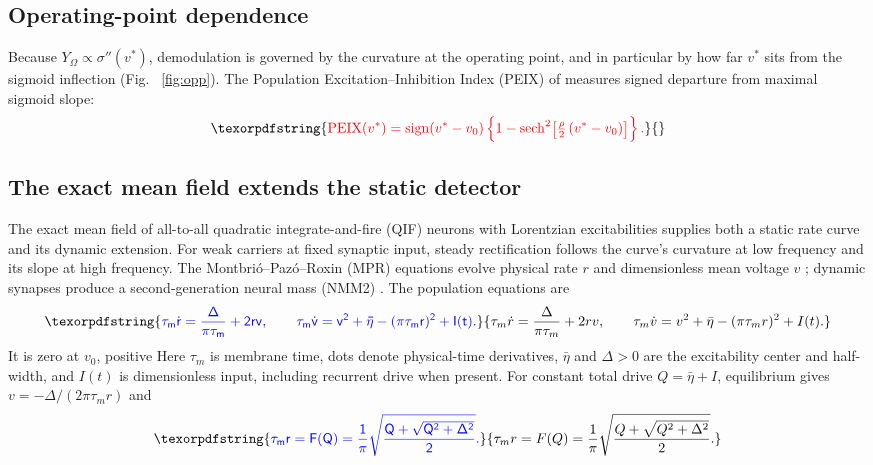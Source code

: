 \documentclass[11pt,a4paper]{article}
\newcommand{\Sig}{\sigma}
\providecommand{\DIFaddtex}[1]{{\protect\color{blue} \sf #1}} %
\providecommand{\DIFdeltex}[1]{{\protect\color{red} \scriptsize #1}} %
\providecommand{\DIFaddbegin}{} %
\providecommand{\DIFaddend}{} %
\providecommand{\DIFdelbegin}{} %
\providecommand{\DIFdelend}{} %
\providecommand{\DIFadd}[1]{\texorpdfstring{\DIFaddtex{#1}}{#1}} %
\providecommand{\DIFdel}[1]{\texorpdfstring{\DIFdeltex{#1}}{}} %
\begin{document}
\DIFdelbegin \subsection{\DIFdel{Operating-point dependence}}%
\addtocounter{subsection}{-1}%
\DIFdel{Because $Y_\Omega\propto\Sig''(v^*)$, demodulation is governed by the curvature at
the operating point, and in particular by how far $v^*$ sits from the sigmoid
inflection (Fig. ~\ref{fig:opp}). The Population Excitation--Inhibition Index (PEIX) of \cite{ruffini2025cfc} measures signed departure from maximal sigmoid slope:
}\begin{displaymath}
\DIFdel{\mathrm{PEIX}(v^*)=\operatorname{sign}(v^*-v_0)
\left\{1-\operatorname{sech}^2\!\Big[\tfrac{\rho}{2}\,(v^*-v_0)\Big]\right\}.
}\end{displaymath}%
\DIFdelend \DIFaddbegin \subsection{\DIFadd{The exact mean field extends the static detector}}\label{sec:dynamic}
\DIFadd{The exact mean field of all-to-all quadratic integrate-and-fire (QIF) neurons
with Lorentzian excitabilities supplies both a static rate curve and its
dynamic extension. For weak carriers at fixed synaptic input, steady
rectification follows the curve's curvature at low frequency and its slope
at high frequency. The Montbri\'o--Paz\'o--Roxin (MPR) equations evolve physical
rate $r$ and dimensionless mean voltage $v$ \cite{montbrio2015}; dynamic
synapses produce a second-generation neural mass (NMM2)
\cite{ruffini2021nmm2,clusella2023}. The population equations are
}\begin{equation}
\DIFadd{\tau_m\dot r=\frac{\Delta}{\pi\tau_m}+2rv,\qquad
\tau_m\dot v=v^2+\bar\eta-(\pi\tau_m r)^2+I(t).
\label{eq:mpr}
}\end{equation}\DIFaddend
\DIFdelbegin \DIFdel{It is zero at
$v_0$, positive }\DIFdelend \DIFaddbegin \DIFadd{Here $\tau_m$ is membrane time, dots denote physical-time derivatives,
$\bar\eta$ and $\Delta>0$ are the excitability center and half-width, and
$I(t)$ is dimensionless input, including recurrent drive when present.
For constant total drive $Q=\bar\eta+I$, equilibrium gives
$v=-\Delta/(2\pi\tau_m r)$ and
}\begin{equation}
\DIFadd{\tau_m r=F(Q)=\frac{1}{\pi}\sqrt{\frac{Q+\sqrt{Q^2+\Delta^2}}{2}} .
\label{eq:Fmpr}
}\end{equation}
\end{document}

